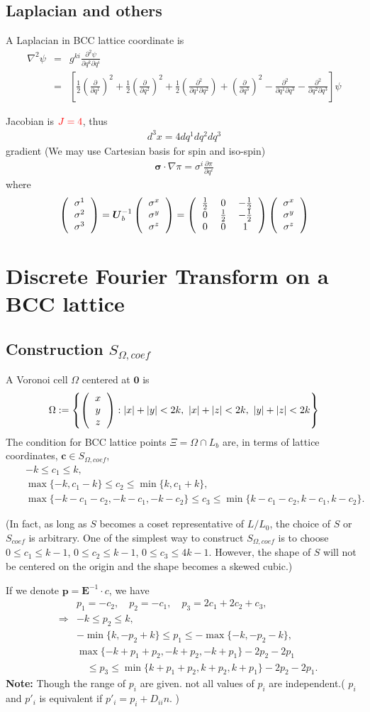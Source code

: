\documentclass[10pt]{book}
\def\bm{\boldsymbol}
\newcommand{\bea}{\begin{eqnarray}}
\newcommand{\eea}{\end{eqnarray}}
\newcommand{\no}{\nonumber \\}
\newcommand{\del}{\partial}
\def\vp{{\bm p}}
\newcommand{\colmthr}[3]
{\left(\begin{tabular}{c} {$#1$}\\{$#2$}\\{$#3$}\end{tabular}\right)}
\newcommand{\threedmat}[9]
{\left(\begin{tabular}{ccc} {$#1$}&{$#2$}&{$#3$} \\
		{$#4$}&{$#5$}&{$#6$}\\
		{$#7$}&{$#8$}&{$#9$}\\
	    \end{tabular}\right)}
\begin{document}
\subsection{Laplacian and others} 
A Laplacian in BCC lattice coordinate is
\bea 
\nabla^2 \psi&=& g^{ki}\frac{\del^2\psi}{\del q^k \del q^i} \no 
             &=&\left[ \frac{1}{2}(\frac{\del}{\del q^1})^2+\frac{1}{2}(\frac{\del}{\del q^2})^2
+ \frac{1}{2}(\frac{\del^2}{\del q^1 \del q^2})
+(\frac{\del}{\del q^3})^2-\frac{\del^2}{\del q^1 \del q^3}  
-\frac{\del^2}{\del q^2 \del q^3}
\right]\psi                             
\eea 

Jacobian is ${\color{red} J=4}$, thus
\bea 
d^3 x = 4 d q^1 d q^2 d q^3
\eea 
gradient (We may use Cartesian basis for spin and iso-spin)
\bea 
{\bm \sigma}\cdot\nabla \pi = \sigma^i \frac{\del \pi}{\del q^i}
\eea 
where 
\bea 
\colmthr{\sigma^1}{\sigma^2}{\sigma^3}={\bm U}_{b}^{-1}\colmthr{\sigma^x}{\sigma^y}{\sigma^z}
= \threedmat{\frac{1}{2}}{0}{-\frac{1}{2}}{0}{\frac{1}{2}}{-\frac{1}{2}}{0}{0}{1}
\colmthr{\sigma^x}{\sigma^y}{\sigma^z}
\eea 

\section{Discrete Fourier Transform on a BCC lattice}

\subsection{Construction $S_{\Omega,coef}$}
A Voronoi cell  $\Omega$ centered at ${\bm 0}$ is  
\bea 
\Omega:=\left\{\colmthr{x}{y}{z}: |x|+|y|< 2k,\ |x|+|z|< 2k,\ |y|+|z|< 2k \right\}
\eea 
The condition for BCC lattice points $\Xi=\Omega\cap L_b$ are, in terms of lattice coordinates,
${\bm c}\in S_{\Omega,coef}$, 
\bea 
& & -k\leq c_1 \leq k,\no 
& &\max\{-k,c_1-k\}\leq c_2 \leq \min\{k,c_1+k\},\no 
& &\max\{-k-c_1-c_2,-k-c_1,-k-c_2\}\leq c_3 \leq \min\{k-c_1-c_2,k-c_1,k-c_2\}.
\eea 

(In fact, as long as $S$ becomes a coset representative of $L/L_0$, 
the choice of $S$ or $S_{coef}$ is arbitrary. 
One of the simplest way to construct $S_{\Omega,coef}$
is to choose $0\leq c_1\leq k-1$, $0\leq c_2\leq k-1$, $0\leq c_3\leq 4k-1$.
However, the shape of $S$ will not be centered on the origin
and the shape becomes a skewed cubic.)

If we denote $\vp={\bm E}^{-1}\cdot c$, we have 
\bea 
& & p_1=-c_2,\quad p_2=-c_1,\quad p_3=2c_1+2c_2+c_3,\no 
&\Rightarrow &-k\leq p_2\leq k,\no 
& & -\min\{k,-p_2+k\}\leq p_1 \leq -\max\{-k,-p_2-k\},\no 
& & \max\{-k+p_1+p_2,-k+p_2,-k+p_1\}-2p_2-2p_1 \no 
& &\quad \leq p_3 \leq \min\{k+p_1+p_2,k+p_2,k+p_1\}-2p_2-2p_1.
\eea 
{\bf Note:} Though the range of $p_i$ are given. 
not all values of $p_i$ are independent.( $p_i$ and $p'_i$ is equivalent if 
$p'_i=p_i+D_{ii}n$. )
\end{document}
